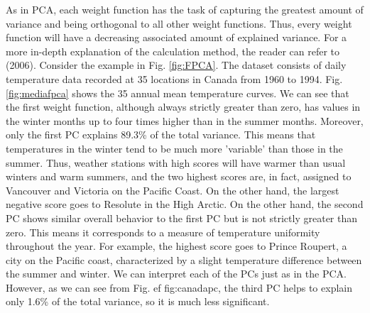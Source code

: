 As in PCA, each weight function has the task of capturing the greatest amount of variance and being orthogonal to all other weight functions. Thus, every weight function will have a decreasing associated amount of explained variance. For a more in-depth explanation of the calculation method, the reader can refer to \citeauthor{ramsay_functional_2006} (2006). Consider the example in Fig. \ref{fig:FPCA}.  The dataset consists of daily temperature data recorded at 35 locations in Canada from 1960 to 1994. Fig. \ref{fig:mediafpca} shows the 35 annual mean temperature curves. We can see that the first weight function, although always strictly greater than zero, has values in the winter months up to four times higher than in the summer months. Moreover, only the first PC explains 89.3\% of the total variance. This means that temperatures in the winter tend to be much more 'variable' than those in the summer. Thus, weather stations with high scores will have warmer than usual winters and warm summers, and the two highest scores are, in fact, assigned to Vancouver and Victoria on the Pacific Coast. On the other hand, the largest negative score goes to Resolute in the High Arctic. On the other hand, the second PC shows similar overall behavior to the first PC but is not strictly greater than zero. This means it corresponds to a measure of temperature uniformity throughout the year. For example, the highest score goes to Prince Roupert, a city on the Pacific coast, characterized by a slight temperature difference between the summer and winter. We can interpret each of the PCs just as in the PCA. However, as we can see from Fig. ef {fig:canadapc}, the third PC helps to explain only 1.6\% of the total variance, so it is much less significant.


